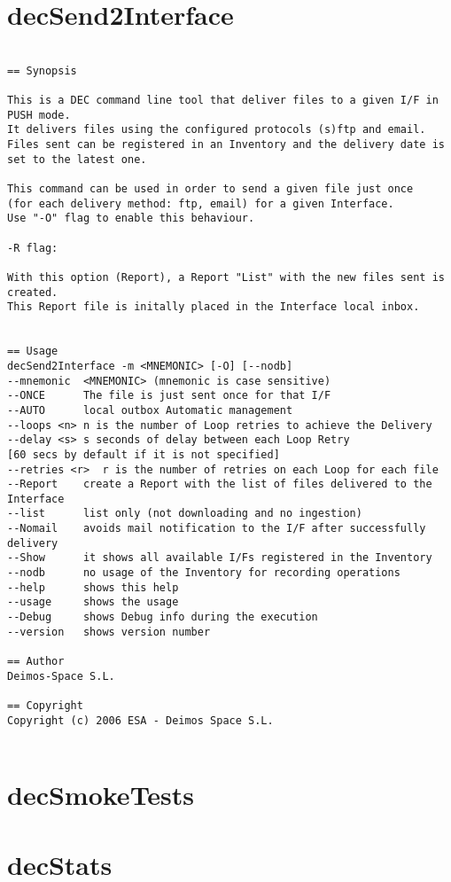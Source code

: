 \documentclass[dec_sum_main.tex]{subfiles}
\begin{document}
\section{decSend2Interface}

\begin{verbatim}

== Synopsis

This is a DEC command line tool that deliver files to a given I/F in PUSH mode.
It delivers files using the configured protocols (s)ftp and email. 
Files sent can be registered in an Inventory and the delivery date is set to the latest one.

This command can be used in order to send a given file just once 
(for each delivery method: ftp, email) for a given Interface. 
Use "-O" flag to enable this behaviour.

-R flag:

With this option (Report), a Report "List" with the new files sent is created. 
This Report file is initally placed in the Interface local inbox.


== Usage
decSend2Interface -m <MNEMONIC> [-O] [--nodb]
--mnemonic  <MNEMONIC> (mnemonic is case sensitive)
--ONCE      The file is just sent once for that I/F
--AUTO      local outbox Automatic management 
--loops <n> n is the number of Loop retries to achieve the Delivery
--delay <s> s seconds of delay between each Loop Retry
[60 secs by default if it is not specified]
--retries <r>  r is the number of retries on each Loop for each file
--Report    create a Report with the list of files delivered to the Interface
--list      list only (not downloading and no ingestion)
--Nomail    avoids mail notification to the I/F after successfully delivery
--Show      it shows all available I/Fs registered in the Inventory
--nodb      no usage of the Inventory for recording operations
--help      shows this help
--usage     shows the usage
--Debug     shows Debug info during the execution
--version   shows version number

== Author
Deimos-Space S.L.

== Copyright
Copyright (c) 2006 ESA - Deimos Space S.L.


\end{verbatim}

\section{decSmokeTests}

\label{decStats}
\section{decStats}
\end{document}
